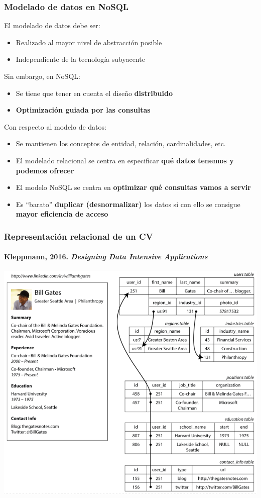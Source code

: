 \documentclass[14pt]{beamer}
\begin{document}
\begin{frame}[allowframebreaks]
  \frametitle{Modelado de datos en NoSQL}
El modelado de datos debe ser:
  \begin{itemize}
  \item Realizado al mayor nivel de abstracción posible
  \item Independiente de la tecnología subyacente
  \end{itemize}
Sin embargo, en NoSQL:
  \begin{itemize}
  \item Se tiene que tener en cuenta el diseño {\bf distribuido}
  \item {\bf Optimización guiada por las consultas}
  \end{itemize}

  \framebreak
Con respecto al modelo de datos:

\begin{itemize}
\item Se mantienen los conceptos de entidad, relación, cardinalidades, etc.
\item El modelado relacional se centra en especificar {\bf qué datos
    tenemos y podemos ofrecer}
\item El modelo NoSQL se centra en {\bf optimizar qué
    consultas vamos a servir}
\item Es ``barato'' {\bf duplicar (desnormalizar)} los datos si con ello se
  consigue {\bf mayor eficiencia de acceso}
\end{itemize}

\end{frame}

\begin{frame}
  \frametitle{Representación relacional de un CV}
\framesubtitle{Kleppmann, 2016. \emph{Designing Data Intensive Applications}}
  \centering\includegraphics[height=.81\textheight]{img/gates}
\end{frame}
\end{document}
